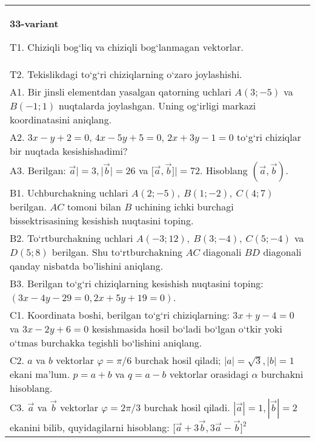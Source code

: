 \documentclass{article}
\begin{document}
\begin{tabular}{m{17cm}}
\textbf{33-variant}

T1. 
Chiziqli bog‘liq va chiziqli bog‘lanmagan vektorlar.
 \\
T2. 
Tekislikdagi to‘g‘ri chiziqlarning o‘zaro joylashishi.
 \\
A1. 
Bir jinsli elementdan yasalgan qatorning uchlari
$A (3;-5) $ va $B (-1;1) $ nuqtalarda joylashgan. Uning og‘irligi
markazi koordinatasini aniqlang.
 \\
A2. 
$3x-y+2=0$, $4x-5y+5=0$, $2x+3y-1=0$
to‘g‘ri chiziqlar bir nuqtada kesishishadimi?
 \\
A3. 
Berilgan: $\overrightarrow{a}| = 3,|\overrightarrow{b}| = 26$ va
$\lbrack\overrightarrow{a},\overrightarrow{b}\rbrack| = 72$. Hisoblang
$\left(\overrightarrow{a},\overrightarrow{b} \right) $.
 \\
B1. 
Uchburchakning uchlari \(A (2;-5),\ B (1;-2),\ C (4;7) \)
berilgan. $AC$ tomoni bilan $B$ uchining ichki burchagi
bissektrisasining kesishish nuqtasini toping.
 \\
B2. 
To‘rtburchakning uchlari
\(A (-3;12),\ B (3;-4),\ C (5;-4) \) va \(D (5;8) \) berilgan. Shu
to‘rtburchakning $AC$ diagonali $BD$ diagonali qanday
nisbatda bo'lishini aniqlang.
 \\
B3. 
Berilgan to‘g‘ri chiziqlarning kesishish nuqtasini toping:
$(3x-4y-29=0, 2x+5y+19=0)$.
 \\
C1. 
Koordinata boshi, berilgan to‘g‘ri chiziqlarning:
\(3x+y-4=0\) va \(3x-2y+6=0\) kesishmasida hosil bo‘ladi
bo‘lgan o‘tkir yoki o‘tmas burchakka tegishli bo‘lishini aniqlang.
 \\
C2. 
$a$ va $b$ vektorlar $\varphi = \pi/6$ burchak hosil qiladi; $|a| = \sqrt{3},|b| = 1$ ekani ma’lum. $p = a + b$ va $q = a - b$ vektorlar orasidagi $\alpha$ burchakni hisoblang.
 \\
C3. 
$\vec{a}$ va $\vec{b}$ vektorlar $\varphi = 2\pi/3$ burchak hosil qiladi. $|\vec{a}| = 1,|\vec{b}| = 2$ ekanini bilib, quyidagilarni hisoblang:
$\lbrack\overrightarrow{a} + 3\overrightarrow{b},3\overrightarrow{a} - \overrightarrow{b}\rbrack^{2}$
 \\

\end{tabular}
\vspace{1cm}
\end{document}
